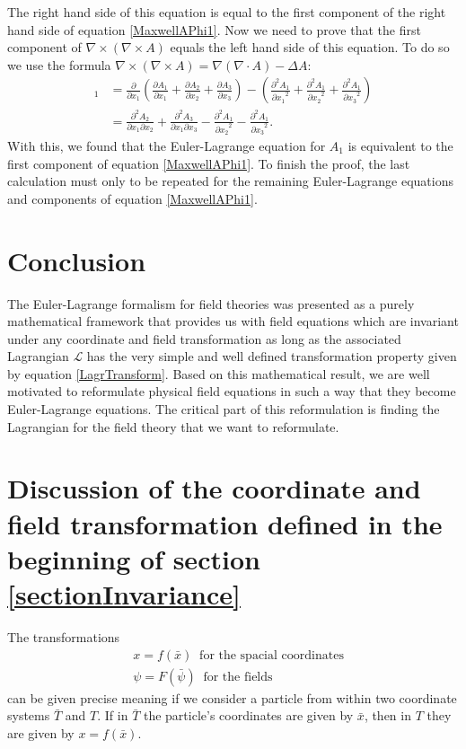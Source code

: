 \documentclass[prb,preprint]{revtex4-1}
\begin{document}
The right hand side of this equation is equal to the first component of the right hand side of equation \eqref{MaxwellAPhi1}.
Now we need to prove that the first component of $\nabla \times \left( \nabla \times A\right)$ equals the left hand side of this equation.
To do so we use the formula
$\nabla \times \left( \nabla \times A\right) = \nabla\left(\nabla \cdot A\right) - \Delta A$:
\begin{align}
[\nabla(\nabla \cdot A) - \Delta A]_1 &=
\frac{\partial}{\partial x_1} \left( \frac{\partial A_1}{\partial x_1} + \frac{\partial A_2}{\partial x_2} + \frac{\partial A_3}{\partial x_3} \right)
- \left( \frac{\partial^2 A_1}{{\partial x_1}^2} + \frac{\partial^2 A_1}{{\partial x_2}^2} + \frac{\partial^2 A_1}{{\partial x_3}^2} \right) \nonumber \\
&=
\frac{\partial^2 A_2}{\partial x_1 \partial x_2} + \frac{\partial^2 A_3}{\partial x_1 \partial x_3}
- \frac{\partial^2 A_1}{{\partial x_2}^2} - \frac{\partial^2 A_1}{{\partial x_3}^2}. 
\end{align}
With this, we found that the Euler-Lagrange equation for $A_1$ is equivalent to the first component of equation \eqref{MaxwellAPhi1}. To finish the proof, the last calculation must only to be repeated for the remaining Euler-Lagrange equations and components of equation \eqref{MaxwellAPhi1}.

\section{Conclusion}
The Euler-Lagrange formalism for field theories was presented as a purely mathematical framework that provides us with field equations which are invariant under any coordinate and field transformation as long as the associated Lagrangian $\mathcal{L}$ has the very simple and well defined transformation property given by equation \eqref{LagrTransform}.
Based on this mathematical result, we are well motivated to reformulate physical field equations in such a way that they become Euler-Lagrange equations.
The critical part of this reformulation is finding the Lagrangian for the field theory that we want to reformulate.

\appendix

\section{Discussion of the coordinate and field transformation defined in the beginning of section \ref{sectionInvariance}} \label{appendixDiscussionTransform}
The transformations
\begin{align}
  &x=f(\bar{x}) \;\; \text{for the spacial coordinates}\\
  &\psi=F(\bar{\psi}) \;\; \text{for the fields}
\end{align}
can be given precise meaning if we consider a particle from within two coordinate systems $\bar{T}$ and $T$.
If in $\bar{T}$ the particle's coordinates are given by $\bar{x}$, then in $T$ they are given by $x = f(\bar{x})$.
\end{document}
